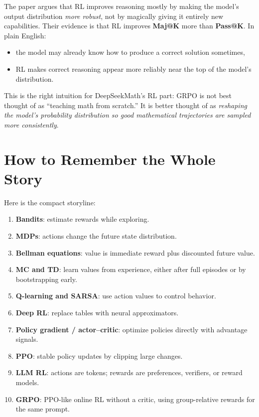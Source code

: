 \documentclass[11pt]{article}
\begin{document}
  The paper argues that RL improves reasoning mostly by making the model's output distribution \emph{more robust}, not by magically giving it entirely new capabilities. Their evidence is that RL improves \textbf{Maj@K} more than \textbf{Pass@K}. In plain English:

  \begin{itemize}
    \item the model may already know how to produce a correct solution sometimes,
    \item RL makes correct reasoning appear more reliably near the top of the model's distribution.
  \end{itemize}

  \begin{takeawaybox}
  This is the right intuition for DeepSeekMath's RL part: GRPO is not best thought of as ``teaching math from scratch.'' It is better thought of as \emph{reshaping the model's probability distribution so good mathematical trajectories are sampled more consistently}.
  \end{takeawaybox}

  \section{How to Remember the Whole Story}

  Here is the compact storyline:

  \begin{enumerate}
    \item \textbf{Bandits}: estimate rewards while exploring.
    \item \textbf{MDPs}: actions change the future state distribution.
    \item \textbf{Bellman equations}: value is immediate reward plus discounted future value.
    \item \textbf{MC and TD}: learn values from experience, either after full episodes or by bootstrapping early.
    \item \textbf{Q-learning and SARSA}: use action values to control behavior.
    \item \textbf{Deep RL}: replace tables with neural approximators.
    \item \textbf{Policy gradient / actor--critic}: optimize policies directly with advantage signals.
    \item \textbf{PPO}: stable policy updates by clipping large changes.
    \item \textbf{LLM RL}: actions are tokens; rewards are preferences, verifiers, or reward models.
    \item \textbf{GRPO}: PPO-like online RL without a critic, using group-relative rewards for the same prompt.
  \end{enumerate}
\end{document}
